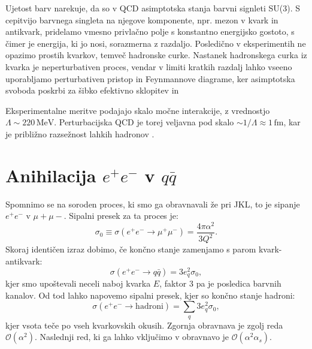 \documentclass[11pt]{article}
\begin{document}
Ujetost barv narekuje, da so v QCD asimptotska stanja barvni signleti SU(3).
S cepitvijo barvnega singleta na njegove komponente, npr. mezon v kvark in antikvark, pridelamo vmesno privlačno polje s konstantno energijsko gostoto,
s čimer je energija, ki jo nosi, sorazmerna z razdaljo.
Posledično v eksperimentih ne opazimo prostih kvarkov, temveč hadronske curke.
Nastanek hadronskega curka iz kvarka je neperturbativen proces, vendar v limiti kratkih razdalj lahko vseeno
uporabljamo perturbativen pristop in Feynmannove diagrame, ker asimptotska svoboda poskrbi za šibko efektivno sklopitev in

Eksperimentalne meritve podajajo skalo močne interakcije, z vrednostjo $\Lambda \sim 220 \, \mathrm{MeV}$.
Perturbacijska QCD je torej veljavna pod skalo $\sim 1/\Lambda \approx 1 \, \mathrm{fm}$,
kar je približno razsežnost lahkih hadronov \cite*{peskin}.






\vspace*{0.5cm}
\section{Anihilacija $e^+e^-$ v $q\bar{q}$}
Spomnimo se na soroden proces, ki smo ga obravnavali že pri JKL, to je sipanje $e^+e^-$ v $\mu+\mu-$.
Sipalni presek za ta proces je:
\begin{equation}
       \sigma_0 \equiv \sigma (e^+e^- \rightarrow \mu^+ \mu^-) = \frac{4 \pi \alpha^2}{3 Q^2}.
\end{equation}
Skoraj identičen izraz dobimo, če končno stanje zamenjamo s parom kvark-antikvark:
\begin{equation}
       \sigma (e^+e^- \rightarrow q \bar{q}) = 3 e_q^2 \sigma_0,
\end{equation}
kjer smo upoštevali neceli naboj kvarka $E$, faktor 3 pa je posledica barvnih kanalov.
Od tod lahko napovemo sipalni presek, kjer so končno stanje hadroni:
\begin{equation}
       \sigma (e^+e^- \rightarrow \text{hadroni}) = \sum_q 3 e_q^2 \sigma_0,
       \label{eq:gornji}
\end{equation}
kjer vsota teče po vseh kvarkovskih okusih.
Zgornja obravnava je zgolj reda $\mathcal{O}(\alpha^2)$.
Naslednji red, ki ga lahko vključimo v obravnavo je $\mathcal{O}(\alpha^2 \alpha_s)$.

\end{document}
